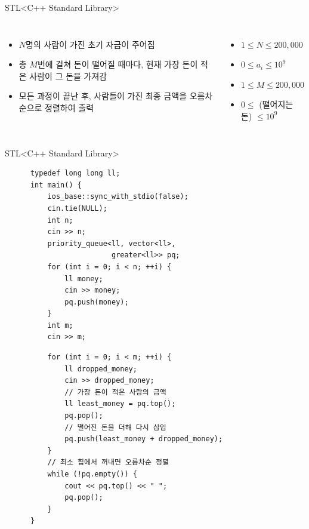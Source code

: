 \begin{frame}{STL}{<C++ Standard Library>}
  \begin{center}
  \end{center}
  \vspace{4mm}
  \begin{columns}[T]
      \begin{itemize}
        \item $N$명의 사람이 가진 초기 자금이 주어짐
        \item 총 $M$번에 걸쳐 돈이 떨어질 때마다, 현재 가장 돈이 적은 사람이 그 돈을 가져감
        \item 모든 과정이 끝난 후, 사람들이 가진 최종 금액을 오름차순으로 정렬하여 출력
      \end{itemize}
      \begin{itemize}
        \item $1 \le N \le 200{,}000$
        \item $0 \le a_i \le 10^9$
        \item $1 \le M \le 200{,}000$
        \item $0 \le$ (떨어지는 돈) $\le 10^9$
      \end{itemize}
  \end{columns}
\end{frame}

\begin{frame}[fragile]{STL}{<C++ Standard Library>}
  \begin{center}
  \end{center}
  \vspace{-1mm}
  \begin{twocol}
    \begin{verbatim}
      typedef long long ll;
      int main() {
          ios_base::sync_with_stdio(false);
          cin.tie(NULL);
          int n;
          cin >> n;
          priority_queue<ll, vector<ll>,
                         greater<ll>> pq;
          for (int i = 0; i < n; ++i) {
              ll money;
              cin >> money;
              pq.push(money);
          }
          int m;
          cin >> m;
    \end{verbatim}
  \colsplit
    \begin{verbatim}
          for (int i = 0; i < m; ++i) {
              ll dropped_money;
              cin >> dropped_money;
              // 가장 돈이 적은 사람의 금액
              ll least_money = pq.top();
              pq.pop();
              // 떨어진 돈을 더해 다시 삽입
              pq.push(least_money + dropped_money);
          }
          // 최소 힙에서 꺼내면 오름차순 정렬
          while (!pq.empty()) {
              cout << pq.top() << " ";
              pq.pop();
          }
      }
    \end{verbatim}
  \end{twocol}
\end{frame}

